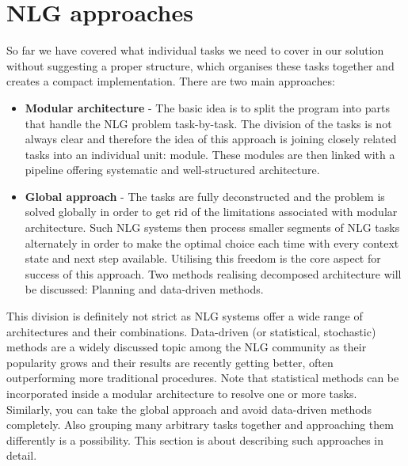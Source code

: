 \chapter{NLG approaches}\label{chap:approaches}
So far we have covered what individual tasks we need to cover in our solution without suggesting a proper structure, which organises these tasks together and creates a compact implementation. There are two main approaches:
\begin{itemize}
	\item \textbf{Modular architecture} - The basic idea is to split the program into parts that handle the NLG problem task-by-task. The division of the tasks is not always clear and therefore the idea of this approach is joining closely related tasks into an individual unit: module. These modules are then linked with a pipeline offering systematic and well-structured architecture.
	\item \textbf{Global approach} - The tasks are fully deconstructed and the problem is solved globally in order to get rid of the limitations associated with modular architecture. Such NLG systems then process smaller segments of NLG tasks alternately in order to make the optimal choice each time with every context state and next step available. Utilising this freedom is the core aspect for success of this approach. Two methods realising decomposed architecture will be discussed: Planning and data-driven methods.
\end{itemize}

This division is definitely not strict as NLG systems offer a wide range of architectures and their combinations. Data-driven (or statistical,  stochastic) methods are a widely discussed topic among the NLG community as their popularity grows and their results are recently getting better, often outperforming more traditional procedures. Note that statistical methods can be incorporated inside a modular architecture to resolve one or more tasks. Similarly, you can take the global approach and avoid data-driven methods completely. Also grouping many arbitrary tasks together and approaching them differently is a possibility. This section is about describing such approaches in detail.

